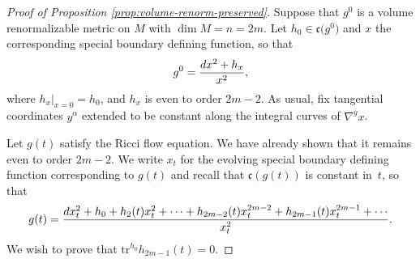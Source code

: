 \documentclass[11pt]{article}
\numberwithin{equation}{section}
\newcommand{\olg}{\overline{g}}
\newcommand{\gin}{{g^0}}
\newcommand{\tr}{\mathrm{tr}}
\begin{document}
\begin{proof}[Proof of Proposition \ref{prop:volume-renorm-preserved}] Suppose that $\gin$ is a volume renormalizable metric on $M$ with $\dim M = n = 2m$. Let $h_0 \in \mathfrak c\big(\gin\big)$ and $x$ the corresponding special boundary defining function, so that
\begin{gather*}%
\gin = \frac{{\rm d}x^2 + h_x}{x^2},
\end{gather*}
where $h_x|_{x=0} = h_0$, and $h_x$ is even to order $2m-2$. As usual, fix tangential coordinates $y^{\alpha}$ extended to be constant along the integral curves of $\nabla^{\olg} x$.

Let $g(t)$ satisfy the Ricci flow equation. We have already shown that it remains even to order $2m-2$. We write $x_t$ for the evolving special boundary defining function corresponding to $g(t)$ and recall that $\mathfrak c(g(t))$ is constant in~$t$, so that
\begin{gather*}%
g(t) = \frac{{\rm d}x_t^2 + h_0 + h_2 (t) x_t^2 + \cdots + h_{2m-2}(t) x_t^{2m-2} + h_{2m-1}(t) x_t^{2m-1} + \cdots}{x_t^2} .
\end{gather*}
We wish to prove that $\tr^{h_0} h_{2m-1}(t) = 0$.


\end{proof}
\end{document}

